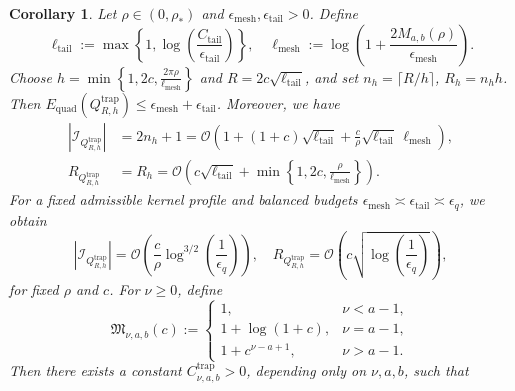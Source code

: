 \documentclass[10pt,a4paper]{amsart}
\newtheorem{cor}{Corollary}
\begin{document}
\begin{cor}\label{trap-budget}
Let \(\rho\in(0,\rho_\ast)\) and \(\epsilon_{\operatorname{mesh}},\epsilon_{\operatorname{tail}}>0\). Define
\begin{equation}\label{eq:tail-log-def}
\ell_{\operatorname{tail}} := \max\left\{1,\log\left(\frac{C_{\operatorname{tail}}}{\epsilon_{\operatorname{tail}}}\right)\right\}, \quad \ell_{\operatorname{mesh}} := \log\left(1+\frac{2M_{a,b}(\rho)}{\epsilon_{\operatorname{mesh}}}\right).
\end{equation}
Choose \(h=\min\left\{1,2c,\frac{2\pi\rho}{\ell_{\operatorname{mesh}}}\right\}\) and \(R=2c\sqrt{\ell_{\operatorname{tail}}}\), and set \(n_h=\lceil R/h\rceil\), \(R_h=n_hh\). Then $E_{\operatorname{quad}}(Q_{R,h}^{\operatorname{trap}})\le \epsilon_{\operatorname{mesh}}+\epsilon_{\operatorname{tail}}$. Moreover, we have
\begin{align}
|\mathcal I_{Q_{R,h}^{\operatorname{trap}}}| &= 2n_h+1 = \mathcal O\left(1+(1+c)\sqrt{\ell_{\operatorname{tail}}}+\frac{c}{\rho}\sqrt{\ell_{\operatorname{tail}}}\,\ell_{\operatorname{mesh}}\right), \label{eq:trap-comparison-cardinality-1}\\
R_{Q_{R,h}^{\operatorname{trap}}} &= R_h = \mathcal O\left(c\sqrt{\ell_{\operatorname{tail}}}+\min\left\{1,2c,\frac{\rho}{\ell_{\operatorname{mesh}}}\right\}\right). \label{eq:trap-comparison-cardinality-2}
\end{align}
For a fixed admissible kernel profile and balanced budgets \(\epsilon_{\operatorname{mesh}}\asymp\epsilon_{\operatorname{tail}}\asymp\epsilon_q\), we obtain
\begin{equation}\label{eq:trap-balanced-cardinality}
|\mathcal I_{Q_{R,h}^{\operatorname{trap}}}| = \mathcal O\left(\frac{c}{\rho}\log^{3/2}\left(\frac1{\epsilon_q}\right)\right), \quad R_{Q_{R,h}^{\operatorname{trap}}} = \mathcal O\left(c\sqrt{\log\left(\frac1{\epsilon_q}\right)}\right),
\end{equation}
for fixed \(\rho\) and \(c\). For \(\nu\ge0\), define
\begin{equation}\label{eq:trap-sharp-moment-scale}
\mathfrak M_{\nu,a,b}(c) := \begin{cases} 1, & \nu<a-1,\\ 1+\log(1+c), & \nu=a-1,\\ 1+c^{\nu-a+1}, & \nu>a-1. \end{cases}
\end{equation}
Then there exists a constant \(C_{\nu,a,b}^{\operatorname{trap}}>0\), depending only on \(\nu,a,b\), such that

\end{cor}
\end{document}
